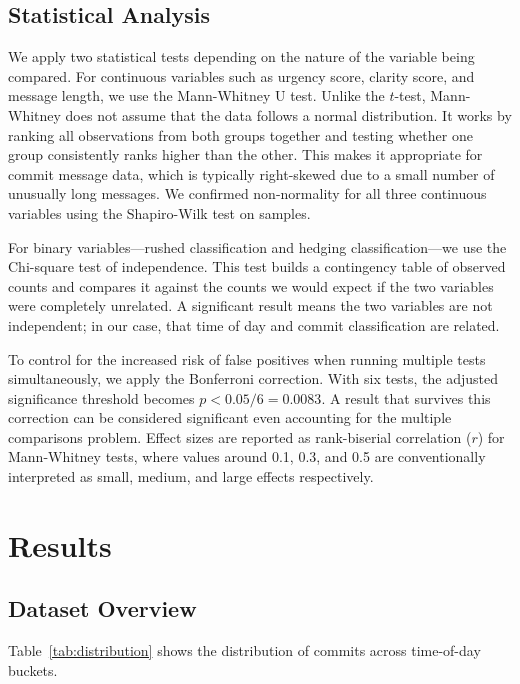 \documentclass[sigconf]{acmart}
\begin{document}
\subsection{Statistical Analysis}

We apply two statistical tests depending on the nature of the variable being compared. For continuous variables such as urgency score, clarity score, and message length, we use the Mann-Whitney U test. Unlike the $t$-test, Mann-Whitney does not assume that the data follows a normal distribution. It works by ranking all observations from both groups together and testing whether one group consistently ranks higher than the other. This makes it appropriate for commit message data, which is typically right-skewed due to a small number of unusually long messages. We confirmed non-normality for all three continuous variables using the Shapiro-Wilk test on samples.

For binary variables---rushed classification and hedging classification---we use the Chi-square test of independence. This test builds a contingency table of observed counts and compares it against the counts we would expect if the two variables were completely unrelated. A significant result means the two variables are not independent; in our case, that time of day and commit classification are related.

To control for the increased risk of false positives when running multiple tests simultaneously, we apply the Bonferroni correction. With six tests, the adjusted significance threshold becomes $p < 0.05/6 = 0.0083$. A result that survives this correction can be considered significant even accounting for the multiple comparisons problem. Effect sizes are reported as rank-biserial correlation ($r$) for Mann-Whitney tests, where values around 0.1, 0.3, and 0.5 are conventionally interpreted as small, medium, and large effects respectively.

\section{Results}

\subsection{Dataset Overview}

Table~\ref{tab:distribution} shows the distribution of commits across time-of-day buckets.
\end{document}
